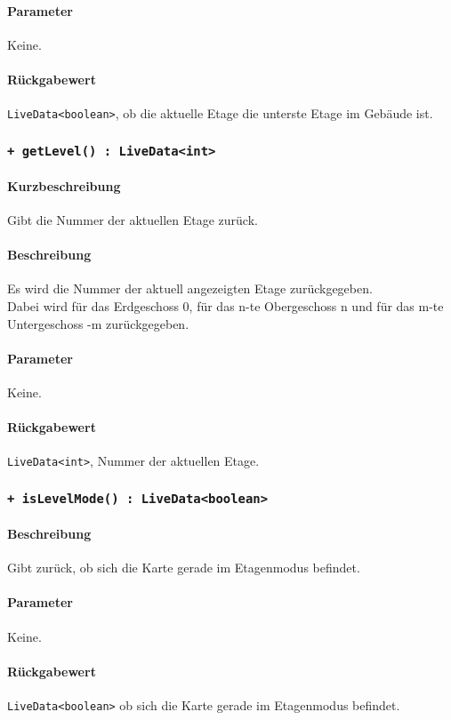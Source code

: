 \paragraph*{Parameter}
Keine.
\paragraph*{Rückgabewert}
\texttt{LiveData<boolean>}, ob die aktuelle Etage die unterste Etage im Gebäude ist.

\subsubsection*{\texttt{+ getLevel() : LiveData<int>}}\label{App_Map_ViewModel_getLevel}%
\paragraph*{Kurzbeschreibung}
Gibt die Nummer der aktuellen Etage zurück.
\paragraph*{Beschreibung}
Es wird die Nummer der aktuell angezeigten Etage zurückgegeben.\\
Dabei wird für das Erdgeschoss 0, für das n-te Obergeschoss n und für das 
m-te Untergeschoss -m zurückgegeben.
\paragraph*{Parameter}
Keine.
\paragraph*{Rückgabewert}
\texttt{LiveData<int>}, Nummer der aktuellen Etage.

\subsubsection*{\texttt{+ isLevelMode() : LiveData<boolean>}}\label{App_Map_ViewModel_isLevelMode}%
\paragraph*{Beschreibung}
Gibt zurück, ob sich die Karte gerade im Etagenmodus befindet.
\paragraph*{Parameter}
Keine.
\paragraph*{Rückgabewert}
\texttt{LiveData<boolean>} ob sich die Karte gerade im Etagenmodus befindet.
